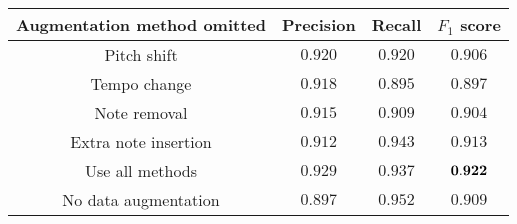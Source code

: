 \begin{tabular}{cccc}
    \textbf{Augmentation method omitted} & Precision & Recall  & $F_1$ score   \\\hline
    Pitch shift                          & $0.920$   & $0.920$ & $0.906$       \\
    Tempo change                         & $0.918$   & $0.895$ & $0.897$       \\
    Note removal                         & $0.915$   & $0.909$ & $0.904$       \\
    Extra note insertion                 & $0.912$   & $0.943$ & $0.913$       \\
    Use all methods                      & $0.929$   & $0.937$ & ${\bf 0.922}$ \\
    No data augmentation                 & $0.897$   & $0.952$ & $0.909$
\end{tabular}
